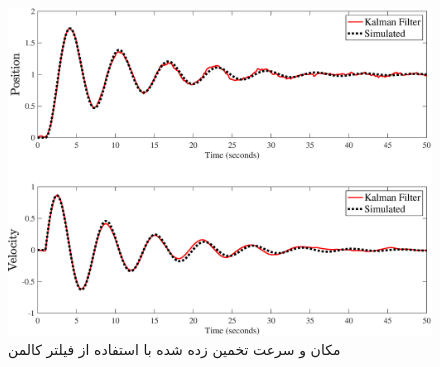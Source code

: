  \begin{figure}[H]
	\centering
	\includegraphics[width=\linewidth]{../Figure/Q4/Kalman}
	
	\caption{مکان و سرعت تخمین زده شده با استفاده از فیلتر کالمن}
\end{figure}